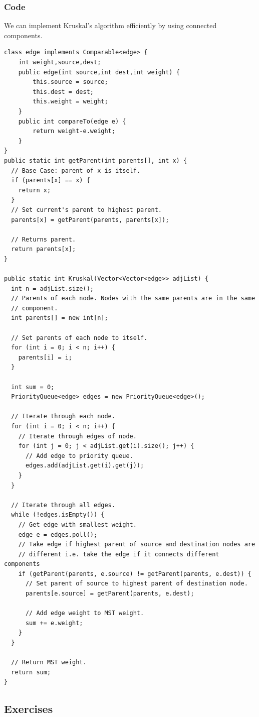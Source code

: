 \documentclass[11pt,oneside]{book}
\begin{document}
\subsubsection{Code}

We can implement Kruskal's algorithm efficiently by using connected components.

\begin{lstlisting}
class edge implements Comparable<edge> {
    int weight,source,dest;
    public edge(int source,int dest,int weight) {
        this.source = source;
        this.dest = dest;
        this.weight = weight;
    }
    public int compareTo(edge e) {
        return weight-e.weight;
    }
}
public static int getParent(int parents[], int x) {
  // Base Case: parent of x is itself.
  if (parents[x] == x) {
    return x;
  }
  // Set current's parent to highest parent.
  parents[x] = getParent(parents, parents[x]);

  // Returns parent.
  return parents[x];
}

public static int Kruskal(Vector<Vector<edge>> adjList) {
  int n = adjList.size();
  // Parents of each node. Nodes with the same parents are in the same
  // component.
  int parents[] = new int[n];

  // Set parents of each node to itself.
  for (int i = 0; i < n; i++) {
    parents[i] = i;
  }

  int sum = 0;
  PriorityQueue<edge> edges = new PriorityQueue<edge>();

  // Iterate through each node.
  for (int i = 0; i < n; i++) {
    // Iterate through edges of node.
    for (int j = 0; j < adjList.get(i).size(); j++) {
      // Add edge to priority queue.
      edges.add(adjList.get(i).get(j));
    }
  }

  // Iterate through all edges.
  while (!edges.isEmpty()) {
    // Get edge with smallest weight.
    edge e = edges.poll();
    // Take edge if highest parent of source and destination nodes are
    // different i.e. take the edge if it connects different components
    if (getParent(parents, e.source) != getParent(parents, e.dest)) {
      // Set parent of source to highest parent of destination node.
      parents[e.source] = getParent(parents, e.dest);
      
      // Add edge weight to MST weight.
      sum += e.weight;
    }
  }

  // Return MST weight.
  return sum;
}
\end{lstlisting}

\subsection{Exercises}
\end{document}
